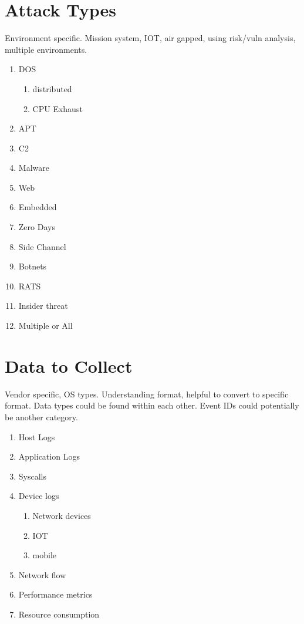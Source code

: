 \documentclass[conference]{IEEEtran}
\begin{document}
\section{Attack Types}
Environment specific. Mission system, IOT, air gapped, using risk/vuln analysis, multiple environments.
\begin{enumerate}
    \item DOS
    \begin{enumerate}
        \item distributed
        \item CPU Exhaust
    \end{enumerate}
    \item APT
    \item C2
    \item Malware
    \item Web
    \item Embedded
    \item Zero Days
    \item Side Channel
    \item Botnets
    \item RATS
    \item Insider threat
    \item Multiple or All
\end{enumerate}
\section{Data to Collect}
Vendor specific, OS types. Understanding format, helpful to convert to specific format. Data types could be found within each other. Event IDs could potentially be another category.
\begin{enumerate}
    \item Host Logs
    \item Application Logs
    \item Syscalls
    \item Device logs
    \begin{enumerate}
        \item Network devices
        \item IOT
        \item mobile
    \end{enumerate}
    \item Network flow
    \item Performance metrics
    \item Resource consumption
\end{enumerate}
\end{document}
